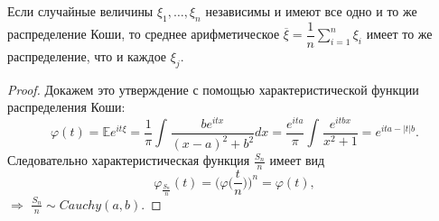 \documentclass[11pt]{article}
\begin{document}
\begin{utv}
	Если случайные величины \( \xi_1,\ldots,\xi_n \) независимы и имеют все одно и то же распределение Коши, то среднее арифметическое \( \overline{\xi}=\dfrac{1}{n}\sum\limits_{i=1}^n\xi_i \) имеет то же распределение, что и каждое \( \xi_j \).
\end{utv}
\begin{proof}
	Докажем это утверждение с помощью характеристической функции распределения Коши:
	\[ \varphi(t) = \mathbb{E}e^{it\xi} = \frac{1}{\pi}\int_{}^{}\frac{be^{itx}}{(x - a)^2 + b^2}dx = \frac{e^{ita}}{\pi}\int_{}^{}\frac{e^{itbx}}{x^2 + 1} = e^{ita - |t|b}. \]
	Следовательно характеристическая функция $\frac{S_n}{n}$ имеет вид
	\[ \varphi_{\frac{S_n}{n}}(t) = \bigg(\varphi\bigg(\frac{t}{n}\bigg)\bigg)^n = \varphi(t), \]
	$\Rightarrow$ $\frac{S_n}{n} \sim Cauchy(a,b)$.
\end{proof}
	
\end{document}
